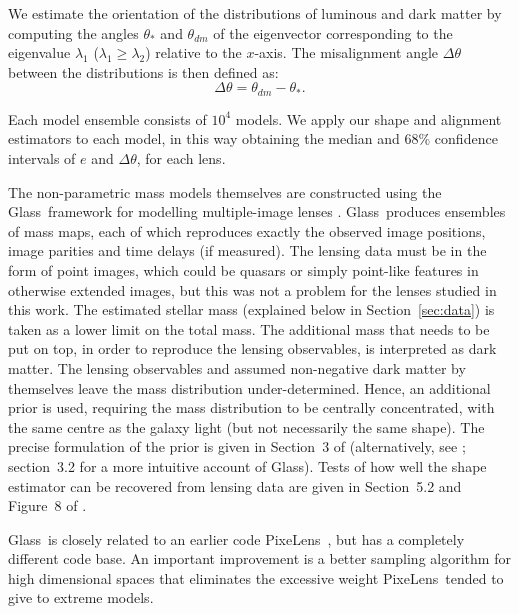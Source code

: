 \documentclass[useAMS,usenatbib]{mn2e}
\def\Glass{{\sc Glass}}
\def\PixeLens{{\sc PixeLens}}
\begin{document}
We estimate the orientation of the distributions of luminous and dark matter by computing the angles $\theta_{*}$ and $\theta_{dm}$ of the eigenvector corresponding to the eigenvalue $\lambda_{1}$ ($\lambda_{1} \geq \lambda_{2}$) relative to the $x$-axis. The misalignment angle $\Delta\theta$ between the distributions is then defined as:
\begin{equation}
  \Delta\theta = \theta_{dm} - \theta_{*}.
\end{equation}

Each model ensemble consists of $10^4$ models. We apply our shape and alignment estimators to each model, in this way obtaining the median and 68\% confidence intervals of $e$ and $\Delta \theta$, for each lens.

The non-parametric mass models themselves are constructed using the \Glass\ framework for modelling multiple-image lenses \citep{2014MNRAS.445.2181C}. \Glass\ produces ensembles of mass maps, each of which reproduces exactly the observed image positions, image parities and time delays (if measured). The lensing data must be in the form of point images, which could be quasars or simply point-like features in otherwise extended images, but this was not a problem for the lenses studied in this work. The estimated stellar mass (explained below in Section~\ref{sec:data}) is taken as a lower limit on the total mass. The additional mass that needs to be put on top, in order to reproduce the lensing observables, is interpreted as dark matter. The lensing observables and assumed non-negative dark matter by themselves leave the mass distribution under-determined. Hence, an additional prior is used, requiring the mass distribution to be centrally concentrated, with the same centre as the galaxy light (but not necessarily the same shape). The precise formulation of the prior is given in Section~3 of \citet{2014MNRAS.445.2181C} (alternatively, see \citep{2015MNRAS.447.2170K}; section~3.2 for a more intuitive account of \Glass). Tests of how well the shape estimator can be recovered from lensing data are given in Section~5.2 and Figure~8 of \citet{2014MNRAS.445.2181C}.

\Glass\ is closely related to an earlier code \PixeLens\ \citep{2004AJ....127.2604S,2008ApJ...679...17C}, but has a completely different code base. An important improvement is a better sampling algorithm for high dimensional spaces \citep{2012MNRAS.425.3077L} that eliminates the excessive weight \PixeLens\ tended to give to extreme models.
\end{document}
